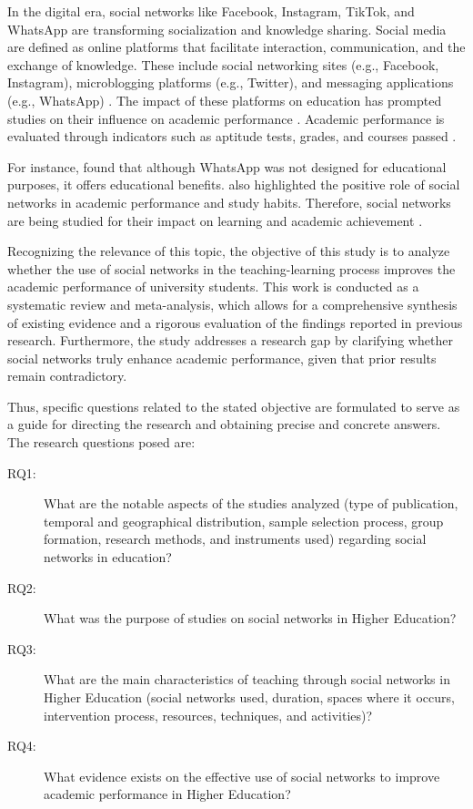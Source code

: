 \documentclass[english]{textolivre}
\begin{document}
In the digital era, social networks like Facebook, Instagram, TikTok, and WhatsApp are transforming socialization and knowledge sharing. Social media are defined as online platforms that facilitate interaction, communication, and the exchange of knowledge. These include social networking sites (e.g., Facebook, Instagram), microblogging platforms (e.g., Twitter), and messaging applications (e.g., WhatsApp) \cite{lee2023, shafiq2023}. The impact of these platforms on education has prompted studies on their influence on academic performance \cite{alfaris2018, asiedu2017}. Academic performance is evaluated through indicators such as aptitude tests, grades, and courses passed \cite{gonzalezvalenzuela2019}.

For instance, \textcite{suarezlantaron2022} found that although WhatsApp was not designed for educational purposes, it offers educational benefits. \textcite{aiyende2021} also highlighted the positive role of social networks in academic performance and study habits. Therefore, social networks are being studied for their impact on learning and academic achievement \cite{lee2023}.

Recognizing the relevance of this topic, the objective of this study is to analyze whether the use of social networks in the teaching-learning process improves the academic performance of university students. This work is conducted as a systematic review and meta-analysis, which allows for a comprehensive synthesis of existing evidence and a rigorous evaluation of the findings reported in previous research. Furthermore, the study addresses a research gap by clarifying whether social networks truly enhance academic performance, given that prior results remain contradictory.

Thus, specific questions related to the stated objective are formulated to serve as a guide for directing the research and obtaining precise and concrete answers. The research questions posed are:

\begin{description}
    \item[RQ1:] What are the notable aspects of the studies analyzed (type of publication, temporal and geographical distribution, sample selection process, group formation, research methods, and instruments used) regarding social networks in education? 
    \item[RQ2:] What was the purpose of studies on social networks in Higher Education? 
    \item[RQ3:] What are the main characteristics of teaching through social networks in Higher Education (social networks used, duration, spaces where it occurs, intervention process, resources, techniques, and activities)?
    \item[RQ4:] What evidence exists on the effective use of social networks to improve academic performance in Higher Education?
\end{description}
\end{document}
